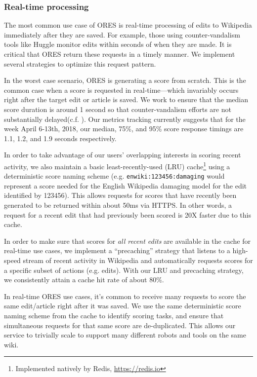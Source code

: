 \subsubsection{Real-time processing}
The most common use case of ORES is real-time processing of edits to Wikipedia immediately after they are saved.  For example, those using counter-vandalism tools like Huggle monitor edits within seconds of when they are made.  It is critical that ORES return these requests in a timely manner.  We implement several strategies to optimize this request pattern.

In the worst case scenario, ORES is generating a score from scratch.  This is the common case when a score is requested in real-time---which invariably occurs right after the target edit or article is saved.  We work to ensure that the median score duration is around 1 second so that counter-vandalism efforts are not substantially delayed(c.f. \cite{geiger13levee}).  Our metrics tracking currently suggests that for the week April 6-13th, 2018, our median, 75\%, and 95\% score response timings are 1.1, 1.2, and 1.9 seconds respectively.

In order to take advantage of our users' overlapping interests in scoring recent activity, we also maintain a basic least-recently-used (LRU) cache\footnote{Implemented natively by Redis, \url{https://redis.io}} using a deterministic score naming scheme (e.g. \texttt{enwiki:123456:damaging} would represent a score needed for the English Wikipedia damaging model for the edit identified by 123456).  This allows requests for scores that have recently been generated to be returned within about 50ms via HTTPS.  In other words, a request for a recent edit that had previously been scored is 20X faster due to this cache.

In order to make sure that scores for \emph{all recent edits} are available in the cache for real-time use cases, we implement a ``precaching'' strategy that listens to a high-speed stream of recent activity in Wikipedia and automatically requests scores for a specific subset of actions (e.g. edits).  With our LRU and precaching strategy, we consistently attain a cache hit rate of about 80\%.

In real-time ORES use cases, it's common to receive many requests to score the same edit/article right after it was saved.  We use the same deterministic score naming scheme from the cache to identify scoring tasks, and ensure that simultaneous requests for that same score are de-duplicated.  This allows our service to trivially scale to support many different robots and tools on the same wiki.

